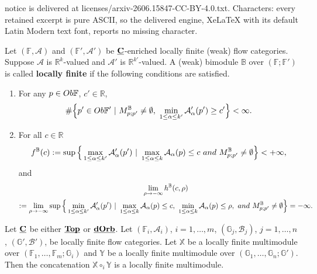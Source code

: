 \documentclass[10pt,a4paper]{amsart}
\newcommand{\beqn}{\begin{equation*}}
\newcommand{\eeqn}{\end{equation*}}
\newcommand{\mb}{\mathbb}
\newcommand{\mc}{\mathcal}
\newcommand{\uds}[1]{\underline{\smash{#1}}}
\begin{document}
notice is delivered at licenses/arxiv-2606.15847-CC-BY-4.0.txt. Characters: every retained excerpt is pure ASCII, so the delivered engine, XeLaTeX with its default Latin Modern text font, reports no missing character.
\begin{defn}\label{defn_local_finite_bimodule}
Let $({\mb F}, {\mc A})$ and $({\mb F}', {\mc A}')$ be $\uds{\bf C}$-enriched locally finite (weak) flow categories. Suppose ${\mc A}$ is ${\mb R}^k$-valued and ${\mc A}'$ is ${\mb R}^{k'}$-valued.  A (weak) bimodule ${\mb B}$ over $({\mb F}; {\mb F}')$ is called {\bf locally finite} if the following conditions are satisfied.

\begin{enumerate}

\item For any $p \in {\rm Ob}{\mb F}$, $c' \in {\mb R}$,
\beqn
 \# \Big\{ p' \in {\rm Ob}{\mb F}'\ |\  M_{p;p'}^{\mb B}  \neq \emptyset,\ \min_{1 \leq \alpha \leq k' } {\mc A}_\alpha' (p') \geq c' \Big\} < \infty.
\eeqn


\item For all $c \in {\mb R}$
\beqn
f^{\mb B}(c):= \sup \Big\{ \max_{1 \leq \alpha \leq k'} {\mc A}_\alpha'(p')\ |\ \max_{1 \leq \alpha \leq k} {\mc A}_\alpha(p) \leq c\ {\rm and}\ M_{p;p'}^{\mb B} \neq \emptyset \Big\} < +\infty,
\eeqn
and
\begin{multline*}
\lim_{\rho \to -\infty} h^{\mb B}(c, \rho)\\
:=\lim_{\rho \to -\infty} \sup \Big\{ \min_{1 \leq \alpha \leq k'} {\mc A}_\alpha'(p')\ |\ \max_{1 \leq \alpha \leq k}{\mc A}_\alpha(p) \leq c,\ \min_{1 \leq \alpha \leq k} {\mc A}_\alpha(p) \leq \rho,\ {\rm and}\ M_{p;p'}^{\mb B} \neq \emptyset \Big\}  = -\infty.
\end{multline*}


\end{enumerate}
\end{defn}

\begin{lemma}\label{lemma_concatenation_Novikov}
Let $\uds{\bf C}$ be either $\uds{\bf Top}$ or $\uds{\bf dOrb}$. Let $({\mb F}_i, {\mc A}_i)$, $i = 1, \ldots, m$, $({\mb G}_j, {\mc B}_j)$, $j = 1, \ldots, n$, $({\mb G}', {\mc B}')$, be locally finite flow categories. Let ${\mb X}$ be a locally finite multimodule over $({\mb F}_1, \ldots, {\mb F}_m; {\mb G}_i)$ and ${\mb Y}$ be a locally finite multimodule over $({\mb G}_1, \ldots, {\mb G}_n; {\mb G}')$. Then the concatenation ${\mb X} \circ_i {\mb Y}$ is a locally finite multimodule. 
\end{lemma}
\end{document}
